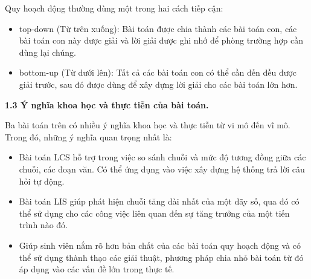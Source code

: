 \smallskip
Quy hoạch động thường dùng một trong hai cách tiếp cận:

\vspace{-0.35cm}
\begin{itemize}
	\item top-down (Từ trên xuống): Bài toán được chia thành các bài toán con, các bài toán con này được giải và lời giải được ghi nhớ để phòng trường hợp cần dùng lại chúng.
	\vspace{-0.25cm}
	\item bottom-up (Từ dưới lên): Tất cả các bài toán con có thể cần đến đều được giải trước, sau đó được dùng để xây dựng lời giải cho các bài toán lớn hơn.
\end{itemize}


\vspace{-0.15cm}
\changefontsizes{14pt}

\setlength{\parindent}{0.0cm}
\textbf{1.3 Ý nghĩa khoa học và thực tiễn của bài toán.}

\smallskip
\changefontsizes{13pt}
\setlength{\parindent}{1cm}
Ba bài toán trên có nhiều ý nghĩa khoa học và thực tiễn từ vi mô đến vĩ mô. Trong đó, những ý nghĩa quan trọng nhất là:


\vspace{-0.35cm}
\begin{itemize}
	\item Bài toán LCS hỗ trợ trong việc so sánh chuỗi và mức độ tương đồng giữa các chuỗi, các đoạn văn. Có thể ứng dụng vào việc xây dựng hệ thống trả lời câu hỏi tự động.
	\vspace{-0.25cm}
	\item Bài toán LIS giúp phát hiện chuỗi tăng dài nhất của một dãy số, qua đó có thể sử dụng cho các công việc liên quan đến sự tăng trưởng của một tiến trình nào đó.
	\vspace{-0.25cm}
	\item Giúp sinh viên nắm rõ hơn bản chất của các bài toán quy hoạch động và có thể sử dụng thành thạo các giải thuật, phương pháp chia nhỏ bài toán từ đó áp dụng vào các vấn đề lớn trong thực tế.
	
\end{itemize}
